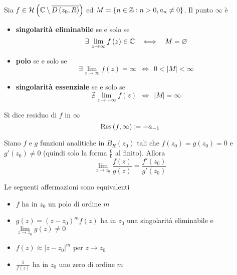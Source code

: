 \begin{thm}
Sia $f\in \mathcal{H} \left(\mathbb{C}  \setminus \overline{D\left(z_{0} ,R\right)}\right)$ ed $M = \left\{n\in \mathbb{Z}  :n > 0,a_{n} \neq 0\right\}$. Il punto $\infty $ è

\begin{itemize}
\item \textbf{singolarità eliminabile} se e solo se\begin{equation*}
\exists \lim\limits _{z\rightarrow \infty } f\left(z\right) \in \CC  \ \ \iff \ \ M = \emptyset 
\end{equation*}
\item \textbf{polo} se e solo se\begin{equation*}
\exists \lim\limits _{z\rightarrow \infty } f\left(z\right) = \infty \ \ \iff \ \ 0 < \left| M\right| < \infty 
\end{equation*}
\item \textbf{singolarità essenziale} se e solo se\begin{equation*}
\nexists \lim\limits _{z\rightarrow + \infty } f\left(z\right) \ \ \iff \ \ \left| M\right| = \infty 
\end{equation*}
\end{itemize}
\end{thm}
\begin{defn}
Si dice residuo di $f$ in $\infty $
\begin{equation*}
\operatorname{Res} \left(f,\infty \right) \coloneqq - a_{ - 1}
\end{equation*}
\end{defn}
\begin{thm}
[di De l'Hôpital] Siano $f$ e $g$ funzioni analitiche in $B_{R}\left(z_{0}\right)$ tali che $f\left(z_{0}\right) = g\left(z_{0}\right) = 0$ e $g'\left(z_{0}\right) \neq 0$ (quindi solo la forma $\frac{0}{0}$ al finito). Allora
\begin{equation*}
\lim\limits _{z\rightarrow z_{0}}\frac{f\left(z\right)}{g\left(z\right)} = \frac{f'\left(z_{0}\right)}{g'\left(z_{0}\right)}
\end{equation*}
\end{thm}
\begin{thm}
Le seguenti affermazioni sono equivalenti
\begin{itemize}
\item $f$ ha in $z_{0}$ un polo di ordine $m$
\item $g\left(z\right) = \left(z - z_{0}\right)^{m} f\left(z\right)$ ha in $z_{0}$ una singolarità eliminabile e $\lim\limits _{z\rightarrow z_{0}} g\left(z\right) \neq 0$
\item $f\left(z\right) \approx \left| z - z_{0}\right| ^{m}$ per $z\rightarrow z_{0}$
\item $\frac{1}{f\left(z\right)}$ ha in $z_{0}$ uno zero di ordine $m$
\end{itemize}
\end{thm}
